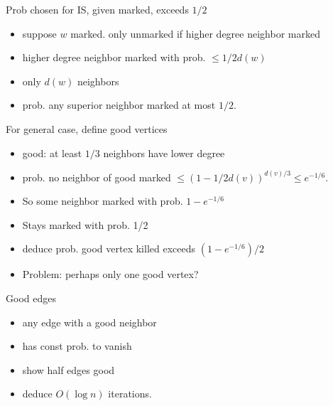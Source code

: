 \documentclass[12pt]{article}
\begin{document}
Prob chosen for IS, given marked, exceeds $1/2$
\begin{itemize}
\item suppose $w$ marked.  only unmarked if higher degree neighbor
  marked
\item higher degree neighbor marked with prob. $\le 1/2d(w)$
\item only $d(w)$ neighbors
\item prob. any superior neighbor marked at most $1/2$.
\end{itemize}

For general case, define good vertices
\begin{itemize}
\item good: at least $1/3$ neighbors have lower degree
\item prob. no neighbor of good marked $\le (1-1/2d(v))^{d(v)/3} \le
  e^{-1/6}$.
\item So some neighbor marked with prob. $1-e^{-1/6}$
\item Stays marked with prob. 1/2
\item deduce prob. good vertex killed exceeds $(1-e^{-1/6})/2$
\item Problem: perhaps only one good vertex?
\end{itemize}

Good edges
\begin{itemize}
\item any edge with a good neighbor
\item has const prob. to vanish
\item show half edges good
\item deduce $O(\log n)$ iterations.
\end{itemize}
\end{document}
